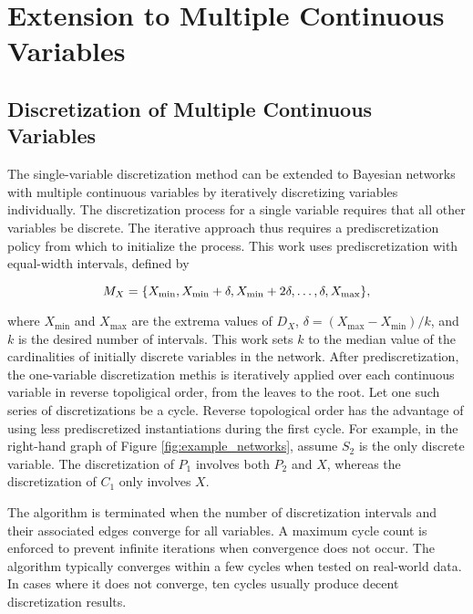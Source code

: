 
\section{Extension to Multiple Continuous Variables}
\label{sec:multi_var}

\subsection{Discretization of Multiple Continuous Variables}

The single-variable discretization method can be extended to Bayesian networks with multiple continuous variables by iteratively discretizing variables individually.
The discretization process for a single variable requires that all other variables be discrete.
The iterative approach thus requires a prediscretization policy from which to initialize the process.
This work uses prediscretization with equal-width intervals, defined by

\begin{equation}
M_X =  \curly{X_\text{min}, X_\text{min} + \delta, X_\text{min} + 2\delta, \ldots, \delta, X_\text{max}}\text{,}
\end{equation}

\noindent
where $X_\text{min}$ and $X_\text{max}$ are the extrema values of $D_X$, $\delta = (X_\text{max} - X_\text{min})/k$, and $k$ is the desired number of intervals.
This work sets $k$ to the median value of the cardinalities of initially discrete variables in the network.
After prediscretization, the one-variable discretization methis is iteratively applied over each continuous variable in reverse topoligical order, from the leaves to the root.
Let one such series of discretizations be a cycle.
Reverse topological order has the advantage of using less prediscretized instantiations during the first cycle.
For example, in the right-hand graph of Figure \ref{fig:example_networks}, assume $S_2$ is the only discrete variable.
The discretization of $P_1$ involves both $P_2$ and $X$, whereas the discretization of $C_1$ only involves $X$.

The algorithm is terminated when the number of discretization intervals and their associated edges converge for all variables.
A maximum cycle count is enforced to prevent infinite iterations when convergence does not occur.
The algorithm typically converges within a few cycles when tested on real-world data.
In cases where it does not converge, ten cycles usually produce decent discretization results.

